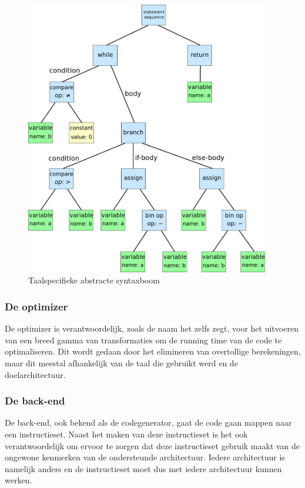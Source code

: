 \begin{figure} [ht]
	\centering
	\includegraphics[width=0.95\textwidth]{img/syntaxtree.png}
	\caption{Taalspecifieke abstracte syntaxboom}
	\label{fig:syntaxtree}
\end{figure}

\subsubsection{De optimizer}
De optimizer is verantwoordelijk, zoals de naam het zelfs zegt, voor het uitvoeren van een breed gamma van transformaties om de running time van de code te optimaliseren. Dit wordt gedaan door het elimineren van overtollige berekeningen, maar dit meestal afhankelijk van de taal die gebruikt werd en de doelarchitectuur.

\subsubsection{De back-end}
De back-end, ook bekend als de codegenerator, gaat de code gaan mappen naar een instructieset. Naast het maken van deze instructieset is het ook verantwoordelijk om ervoor te zorgen dat deze instructieset gebruik maakt van de ongewone kenmerken van de ondersteunde architectuur. Iedere architectuur is namelijk anders en de instructieset moet dus met iedere architectuur kunnen werken. 

